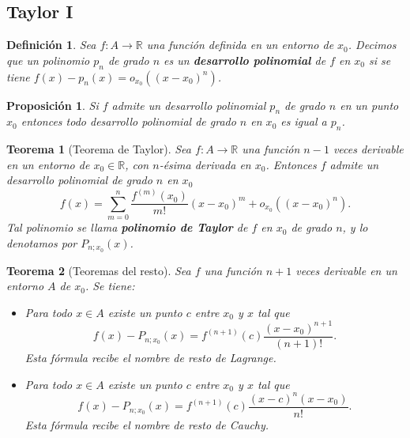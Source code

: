 \documentclass{article}
\newtheorem{theorem}{Teorema}
\newtheorem{prop}{Proposición}
\newtheorem{define}{Definición}
\newcommand{\reales}{\mathbb{R}}
\begin{document}
\subsection{Taylor I}

\begin{define}
	Sea $f: A \rightarrow \reales$ una función definida en un entorno de $x_0$. Decimos que un polinomio $p_n$ de grado $n$ es un \textbf{desarrollo polinomial} de $f$ en $x_0$ si se tiene $f(x) - p_n(x) = o_{x_0}((x-x_0)^n)$.
\end{define}

\begin{prop}
	Si $f$ admite un desarrollo polinomial $p_n$ de grado $n$ en un punto $x_0$ entonces todo desarrollo polinomial de grado $n$ en $x_0$ es igual a $p_n$.
\end{prop}

\begin{theorem}[Teorema de Taylor]
	Sea $f: A \rightarrow \reales$ una función $n-1$ veces derivable en un entorno de $x_0 \in \reales$, con $n$-ésima derivada en $x_0$. Entonces $f$ admite un desarrollo polinomial de grado $n$ en $x_0$
	\begin{equation*}
		f(x) = \sum_{m=0}^{n} \frac{f^{(m)}(x_0)}{m!} (x-x_0)^m + o_{x_0}((x-x_0)^n).
	\end{equation*}
	Tal polinomio se llama \textbf{polinomio de Taylor} de $f$ en $x_0$ de grado $n$, y lo denotamos por $P_{n;x_0}(x)$.
\end{theorem}

\begin{theorem}[Teoremas del resto]
	Sea $f$ una función $n+1$ veces derivable en un entorno $A$ de $x_0$. Se tiene:
	\begin{itemize}
		\item
		Para todo $x \in A$ existe un punto $c$ entre $x_0$ y $x$ tal que
		\begin{equation*}
			f(x) - P_{n;x_0}(x) = f^{(n+1)}(c)\frac{(x-x_0)^{n+1}}{(n+1)!}.
		\end{equation*}
		Esta fórmula recibe el nombre de resto de Lagrange.		
		
		\item
		Para todo $x \in A$ existe un punto $c$ entre $x_0$ y $x$ tal que
		\begin{equation*}
			f(x) - P_{n;x_0}(x) = f^{(n+1)}(c)\frac{(x-c)^n (x-x_0)}{n!}.
		\end{equation*}
		Esta fórmula recibe el nombre de resto de Cauchy.
	\end{itemize}
\end{theorem}
\end{document}
